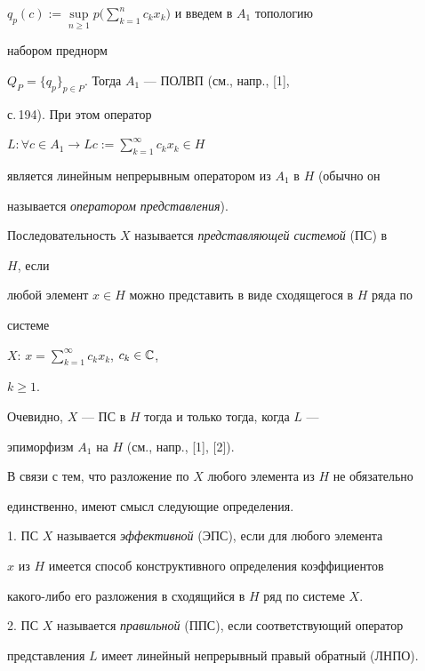 $q_p(c):=\sup\limits_{n\geqslant 1}


p \Big(\sum\limits_{k=1}^{n}c_kx_k\Big)$ и введем в $A_1$ топологию


набором преднорм


$Q_P= \{q_p \}_{p\in P}$. Тогда $A_1$ --- ПОЛВП (см., напр., [1],


с.\,194). При этом оператор


$L:\forall c\in A_1\longrightarrow


Lc:=\sum\limits_{k=1}^{\infty}c_kx_k\in H$


является линейным непрерывным оператором из $A_1$ в $H$ (обычно он


называется {\it оператором представления}\/).





Последовательность $X$ называется {\it представляющей системой} (ПС) в


$H$, если


любой элемент $x\in H$ можно представить в виде сходящегося в $H$ ряда по


системе


$X$: $x=\sum\limits_{k=1}^{\infty}c_kx_k$, $c_k\in \Bbb{C}$,


$k\geqslant 1$.


Очевидно, $X$ --- ПС в $H$ тогда и только тогда, когда $L$ ---


эпиморфизм $A_1$ на $H$ (см., напр., [1], [2]).





В связи с тем, что разложение по $X$ любого элемента из $H$ не обязательно


единственно, имеют смысл следующие определения.





1. ПС $X$ называется {\it эффективной} (ЭПС), если для любого элемента


$x$ из $H$ имеется способ конструктивного определения коэффициентов 


какого-либо его разложения в сходящийся в $H$ ряд по системе $X$.





2. ПС $X$ называется {\it правильной} (ППС), если соответствующий оператор


представления $L$ имеет линейный непрерывный правый обратный (ЛНПО).





